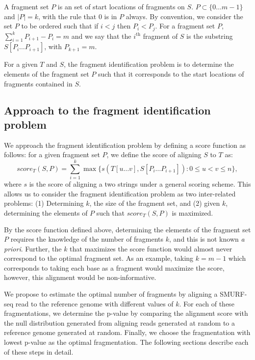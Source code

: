 A fragment set $P$ is an set of start locations of fragments on $S$. $P
\subset \{0 \dots m-1\}$ and $|P| = k$, with the rule that $0$ is in $P$
always.
By convention, we consider the set $P$ to be ordered such that if $i < j$
then $P_i < P_j$.
For a fragment set $P$, $\sum_{i = 1}^{k} P_{i+1} - P_i = m$ and we say
that the $i^{\text{th}}$ fragment of $S$ is the substring $S[P_i \dots
P_{i+1}]$, with $P_{k+1} = m$.

For a given $T$ and $S$, the fragment identification problem is to
determine the elements of the fragment set $P$ such that it corresponds
to the start locations of fragments contained in $S$.



\subsection{Approach to the fragment identification problem}
We approach the fragment identification problem by defining a score
function as follows:
for a given fragment set $P$, we define the score of aligning $S$ to $T$
as: \[score_T(S,P) = \sum_{i=1}^{k} \max\{s(T[u \dots v],
S[P_i \dots P_{i+1}]): 0 \leq u < v \leq n\},\] where $s$ is the score
of aligning a two strings under a general scoring scheme.
%
This allows us to consider the fragment identification problem as two
inter-related problems: (1) Determining $k$, the size of the fragment
set, and (2) given $k$, determining the elements of $P$ such that
$score_T(S, P)$ is maximized.

By the score function defined above, determining the elements of the
fragment set $P$ requires the knowledge of the number of fragments $k$,
and this is not known \emph{a priori}. Further, the $k$ that maximizes
the score function would almost never correspond to the optimal fragment
set. As an example, taking $k=m-1$ which corresponds to taking each base
as a fragment would maximize the score, however, this alignment would be
non-informative.

We propose to estimate the optimal number of fragments by aligning a
SMURF-seq read to the reference genome with different values of $k$. For
each of these fragmentations, we determine the p-value by comparing the
alignment score with the null distribution generated from aligning reads
generated at random to a reference genome generated at random. Finally,
we choose the fragmentation with lowest p-value as the optimal
fragmentation.  The following sections describe each of these steps in
detail.

